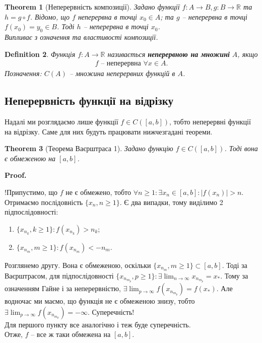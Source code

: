 \documentclass[a4paper, 14pt]{article}
\makeatletter
\def\qed{$\blacksquare$}
\theoremstyle{theoremdd}
\newtheorem{theorem}{Theorem}[subsection]
\theoremstyle{theoremdd}
\newtheorem{definition}[theorem]{Definition}
\theoremstyle{theoremdd}
\theoremstyle{theoremdd}
\theoremstyle{theoremdd}
\theoremstyle{theoremdd}
\theoremstyle{theoremdd}
\theoremstyle{theoremdd}
\renewenvironment{proof}[1][Proof.\\]{\par
\pushQED{\hfill \qed}%
\normalfont \topsep6\p@\@plus6\p@\relax
\trivlist
\item\relax
{\bfseries
#1\@addpunct{.}}\hspace\labelsep\ignorespaces
}{%
\popQED\endtrivlist\@endpefalse
}
\makeatother
\begin{document}
\begin{theorem}[Неперервність композиції]
Задано функції $f \colon A \to B, g \colon B \to \mathbb{R}$ та $h = g \circ f$. Відомо, що $f$ неперервна в точці $x_0 \in A$; та $g$ -- неперервна в точці $f(x_0) = y_0 \in B$. Тоді $h$ -- неперервна в точці $x_0$.\\
\textit{Випливає з означення та властивості композиції.}
\end{theorem}

\begin{definition}
Функція $f \colon A \to \mathbb{R}$ називається \textbf{неперервною на множині} $A$, якщо
\begin{align*}
\text{$f$ -- неперервна $\forall x \in A$}.
\end{align*}
Позначення: $C(A)$ -- множина неперервних функцій в $A$.
\end{definition}

\subsection{Неперервність функції на відрізку}
Надалі ми розглядаємо лише функції $f \in C([a,b])$, тобто неперервні функції на відрізку. Саме для них будуть працювати нижчезгадані теореми.

\begin{theorem}[Теорема Ваєрштраса 1]
Задано функцію $f \in C([a,b])$. Тоді вона є обмеженою на $[a,b]$.
\end{theorem}

\begin{proof}
!Припустимо, що $f$ не є обмежено, тобто $\forall n \geq 1: \exists x_n \in [a,b]: |f(x_n)| > n$. Отримаємо послідовність $\{x_n,n \geq 1\}$. Є два випадки, тому виділимо 2 підпослідовності:
\begin{enumerate}[nosep,wide=0pt,label={\arabic*)}]
\item $\{x_{n_k}, k \geq 1\}: f(x_{n_k})>n_k$;
\item $\{x_{n_m}, m \geq 1\}: f(x_{n_m})<-n_m$.
\end{enumerate}
Розглянемо другу. Вона є обмеженою, оскільки $\{x_{n_m}, m \geq 1\} \subset [a,b]$. Тоді за Ваєрштрасом, для підпослідовності $\{x_{n_{m_p}}, p \geq 1\}: \exists \displaystyle \lim_{n \to \infty} x_{n_{m_p}} =x_*$. Тому за означенням Гайне і за неперервністю, $\exists \displaystyle \lim_{p \to \infty} f(x_{n_{m_p}}) = f(x_*)$. Але водночас ми маємо, що функція не є обмеженою знизу, тобто $\exists \displaystyle \lim_{p \to \infty} f(x_{n_{m_p}}) = -\infty$. Суперечність!\\
Для першого пункту все аналогічно і теж буде суперечність.\\
Отже, $f$ -- все ж таки обмежена на $[a,b]$.
\end{proof}
\end{document}
